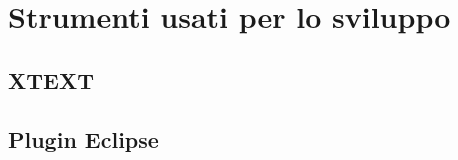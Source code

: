 \chapter{Strumenti usati per lo sviluppo}
\label{chap:Strumenti usati per lo sviluppo}

\section{XTEXT}
\label{sec:XTEXT}

\section{Plugin Eclipse}
\label{sec:Plugin Eclipse}
